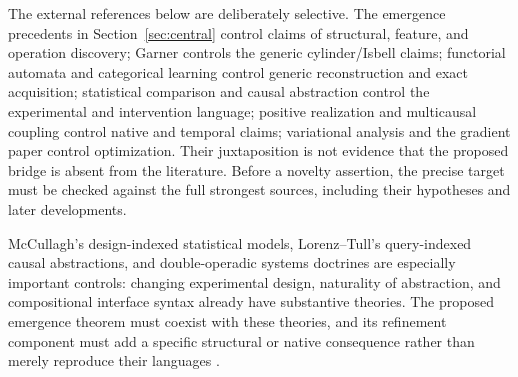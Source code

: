 \documentclass[11pt]{article}
\theoremstyle{remark}
\begin{document}
The external references below are deliberately selective. The emergence precedents in Section~\ref{sec:central} control claims of structural, feature, and operation discovery; Garner controls the generic cylinder/Isbell claims; functorial automata and categorical learning control generic reconstruction and exact acquisition; statistical comparison and causal abstraction control the experimental and intervention language; positive realization and multicausal coupling control native and temporal claims; variational analysis and the gradient paper control optimization. Their juxtaposition is not evidence that the proposed bridge is absent from the literature. Before a novelty assertion, the precise target must be checked against the full strongest sources, including their hypotheses and later developments.

McCullagh's design-indexed statistical models, Lorenz--Tull's query-indexed causal abstractions, and double-operadic systems doctrines are especially important controls: changing experimental design, naturality of abstraction, and compositional interface syntax already have substantive theories. The proposed emergence theorem must coexist with these theories, and its refinement component must add a specific structural or native consequence rather than merely reproduce their languages \cite{McCullagh,LorenzTull,SystemsDoctrines}.
\end{document}
